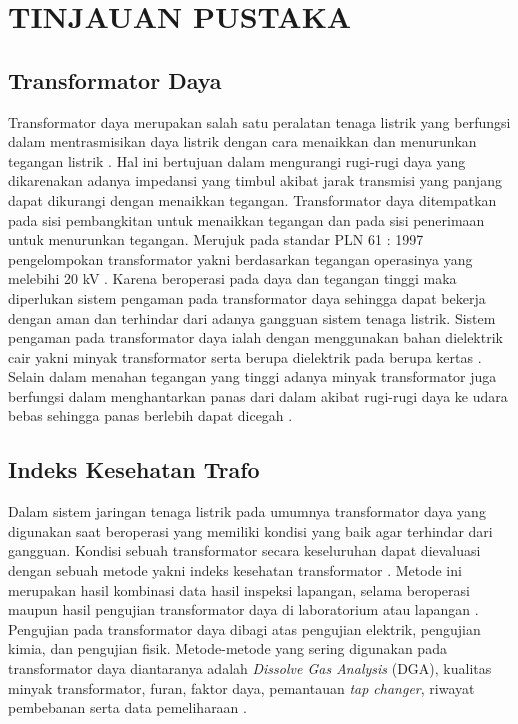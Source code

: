 \chapter{TINJAUAN PUSTAKA}
\label{BAB2:tinjauan}
\section{Transformator Daya}

Transformator daya merupakan salah satu peralatan tenaga listrik yang berfungsi dalam mentrasmisikan daya listrik dengan cara menaikkan dan menurunkan tegangan  listrik \cite{sutaryono2015analisa}. Hal ini bertujuan dalam mengurangi rugi-rugi daya yang dikarenakan adanya impedansi yang timbul akibat jarak transmisi yang panjang dapat dikurangi dengan menaikkan tegangan. Transformator daya ditempatkan pada sisi pembangkitan untuk menaikkan tegangan dan pada sisi penerimaan untuk menurunkan tegangan. Merujuk pada standar PLN 61 : 1997 pengelompokan transformator yakni berdasarkan tegangan operasinya yang melebihi 20 kV \cite{sutaryono2015analisa}. Karena beroperasi pada daya dan tegangan tinggi maka diperlukan sistem pengaman pada transformator daya sehingga dapat bekerja dengan aman dan terhindar dari adanya gangguan sistem tenaga listrik. Sistem pengaman pada transformator daya ialah dengan menggunakan bahan dielektrik cair yakni minyak transformator serta berupa dielektrik pada berupa kertas . Selain dalam menahan tegangan yang tinggi adanya minyak transformator juga berfungsi dalam menghantarkan panas dari dalam akibat rugi-rugi daya ke udara bebas sehingga panas berlebih dapat dicegah \cite{krause2012power}.




\section{Indeks Kesehatan Trafo}
Dalam sistem jaringan tenaga listrik pada umumnya transformator daya yang digunakan saat beroperasi yang memiliki kondisi yang baik agar terhindar dari gangguan. Kondisi sebuah transformator secara keseluruhan dapat dievaluasi dengan sebuah metode yakni indeks kesehatan transformator \cite{nurcahyanto2019analysis}. Metode ini merupakan hasil kombinasi data hasil inspeksi lapangan, selama beroperasi maupun hasil pengujian transformator daya di laboratorium atau lapangan \cite{ortiz2016health}. Pengujian pada transformator daya dibagi atas pengujian elektrik, pengujian kimia, dan pengujian fisik. Metode-metode yang sering digunakan pada transformator daya diantaranya adalah \textit{Dissolve Gas Analysis} (DGA), kualitas minyak transformator, furan, faktor daya, pemantauan \textit{tap changer}, riwayat pembebanan serta data pemeliharaan \cite{jahromi2009approach}.

